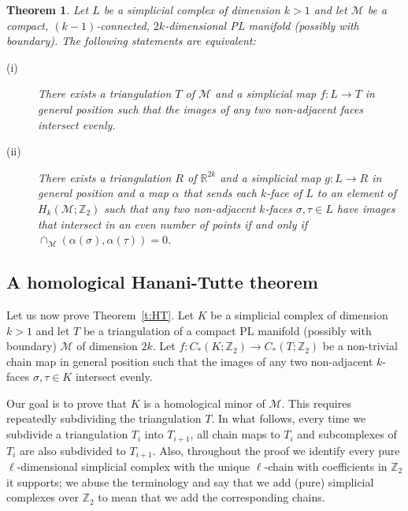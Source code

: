\documentclass[a4paper,UKenglish,thm-restate]{article}
\newcommand{\R}{\mathbb{R}}
\newcommand{\Z}{\mathbb{Z}}
\newcommand{\M}{\mathcal{M}}
\newtheorem{theorem}{Theorem}
\begin{document}
\begin{theorem}
  \label{th:skopenkov}
  Let $L$ be a simplicial complex of dimension $k>1$ and let $\M$ be a compact, $(k-1)$-connected, $2k$-dimensional PL manifold (possibly with boundary). The following statements are equivalent:
  
  \begin{description}
  \item[(i)] There exists a triangulation $T$ of $\M$ and a simplicial map  $f:L \to T$ in general position such that the images of any two non-adjacent faces intersect evenly.\medskip
    
  \item[(ii)] There exists a triangulation $R$ of $\R^{2k}$ and a simplicial map $g: L \to R$ in general position and a map $\alpha$ that sends each $k$-face of $L$ to an element of $H_k(\M;\Z_2)$ such that any two non-adjacent $k$-faces $\sigma,\tau \in L$ have images that intersect in an even number of points if and only if $\cap_{\M}(\alpha(\sigma),\alpha(\tau)) = 0$.
  \end{description}
\end{theorem}


\subsection{A homological Hanani-Tutte theorem} 

Let us now prove Theorem~\ref{t:HT}. Let $K$ be a simplicial complex of dimension $k > 1$ and let $T$ be a triangulation of a compact PL manifold (possibly with boundary) $\M$ of dimension $2k$. Let $f:C_*(K;\Z_2)\to C_*(T; \Z_2)$ be a non-trivial chain map in general position such that the images of any two non-adjacent $k$-faces $\sigma,\tau\in K$ intersect evenly.

\medskip

Our goal is to prove that $K$ is a homological minor of $\M$. This requires repeatedly subdividing the triangulation $T$. In what follows, every time we subdivide a triangulation $T_i$ into $T_{i+1}$, all chain maps to $T_i$ and subcomplexes of $T_i$ are also subdivided to $T_{i+1}$. Also, throughout the proof we identify every pure $\ell$-dimensional simplicial complex with the unique $\ell$-chain with coefficients in $\Z_2$ it supports; we abuse the terminology and say that we add (pure) simplicial complexes over $\Z_2$ to mean that we add the corresponding chains.

\medskip
\end{document}
